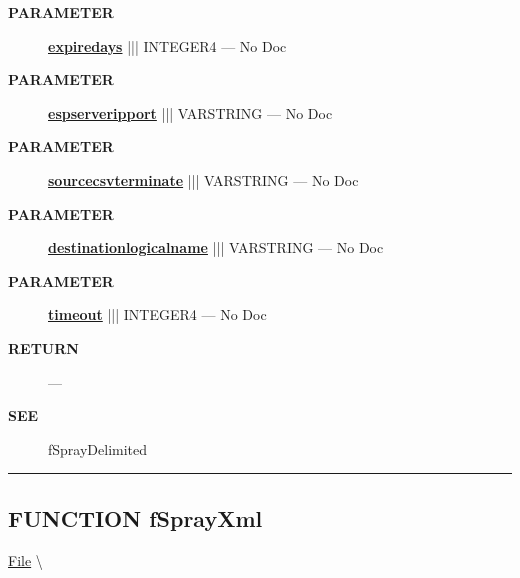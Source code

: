 \begin{description}
\item [\colorbox{tagtype}{\color{white} \textbf{\textsf{PARAMETER}}}] \textbf{\underline{expiredays}} ||| INTEGER4 --- No Doc
\item [\colorbox{tagtype}{\color{white} \textbf{\textsf{PARAMETER}}}] \textbf{\underline{espserveripport}} ||| VARSTRING --- No Doc
\item [\colorbox{tagtype}{\color{white} \textbf{\textsf{PARAMETER}}}] \textbf{\underline{sourcecsvterminate}} ||| VARSTRING --- No Doc
\item [\colorbox{tagtype}{\color{white} \textbf{\textsf{PARAMETER}}}] \textbf{\underline{destinationlogicalname}} ||| VARSTRING --- No Doc
\item [\colorbox{tagtype}{\color{white} \textbf{\textsf{PARAMETER}}}] \textbf{\underline{timeout}} ||| INTEGER4 --- No Doc
\end{description}







\par
\begin{description}
\item [\colorbox{tagtype}{\color{white} \textbf{\textsf{RETURN}}}] \textbf{} --- 
\end{description}







\par
\begin{description}
\item [\colorbox{tagtype}{\color{white} \textbf{\textsf{SEE}}}] fSprayDelimited
\end{description}



\rule{\linewidth}{0.5pt}
\subsection*{\textsf{\colorbox{headtoc}{\color{white} FUNCTION}
fSprayXml}}

\hypertarget{ecldoc:file.fsprayxml}{}
\hspace{0pt} \hyperlink{ecldoc:File}{File} \textbackslash 

